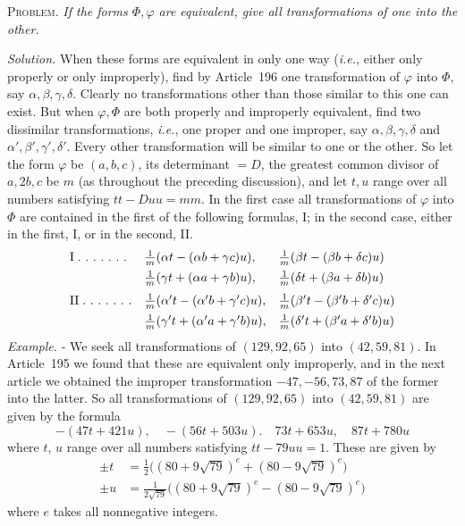 \textsc{Problem.} \textit{If the forms \(\Phi,\varphi\) are equivalent, give all transformations of one into the other.}

\textit{Solution.} When these forms are equivalent in only one way (\textit{i.e.}, either only properly or only improperly), find by Article~196 one transformation of \(\varphi\) into \(\Phi\), say \(\alpha,\beta,\gamma,\delta\). Clearly no transformations other than those similar to this one can exist. But when \(\varphi,\Phi\) are both properly and improperly equivalent, find two dissimilar transformations, \textit{i.e.}, one proper and one improper, say \(\alpha,\beta,\gamma,\delta\) and \(\alpha',\beta',\gamma',\delta'\). Every other transformation will be similar to one or the other. So let the form \(\varphi\) be \((a,b,c)\), its determinant \(=D\), the greatest common divisor of \(a,2b,c\) be \(m\) (as throughout the preceding discussion), and let \(t,u\) range over all numbers satisfying \(tt-Duu=mm\). In the first case all transformations of \(\varphi\) into \(\Phi\) are contained in the first of the following formulas, I; in the second case, either in the first, I, or in the second, II.
\[
\begin{array}{@{}lll@{}}
\mathrm{I}\;\ldotp\,\ldotp\,\ldotp\,\ldotp\,\ldotp\,\ldotp\,\ldotp&\frac1m(\alpha t-(\alpha b+\gamma c)u),&\frac1m(\beta t-(\beta b+\delta c)u)\\[1ex]
&\frac1m(\gamma t+(\alpha a+\gamma b)u),&\frac1m(\delta t+(\beta a+\delta b)u)\\[1.5ex]
\mathrm{II}\;\ldotp\,\ldotp\,\ldotp\,\ldotp\,\ldotp\,\ldotp\,\ldotp&\frac1m(\alpha't-(\alpha'b+\gamma'c)u),&\frac1m(\beta't-(\beta'b+\delta'c)u)\\[1ex]
&\frac1m(\gamma't+(\alpha'a+\gamma'b)u),&\frac1m(\delta't+(\beta'a+\delta'b)u)
\end{array}
\]
\textit{Example.} - We seek all transformations of $(129,92,65)$ into $(42,59,81)$. In Article~195 we found that these are equivalent only improperly, and in the next article we obtained the improper transformation $-47,-56,73,87$ of the former into the latter. So all transformations of $(129,92,65)$ into $(42,59,81)$ are given by the formula
\[
-(47t+421u),\quad -(56t+503u).\quad 73t+653u,\quad 87t+780u
\]
where $t$, $u$ range over all numbers satisfying $tt-79uu=1$. These are given by
\[
\begin{aligned}
\pm t&=\tfrac12\bigl((80+9\sqrt{79})^e+(80-9\sqrt{79})^e\bigr)\\
\pm u&=\tfrac{1}{2\sqrt{79}}\bigl((80+9\sqrt{79})^e-(80-9\sqrt{79})^e\bigr)
\end{aligned}
\]
where $e$ takes all nonnegative integers.

